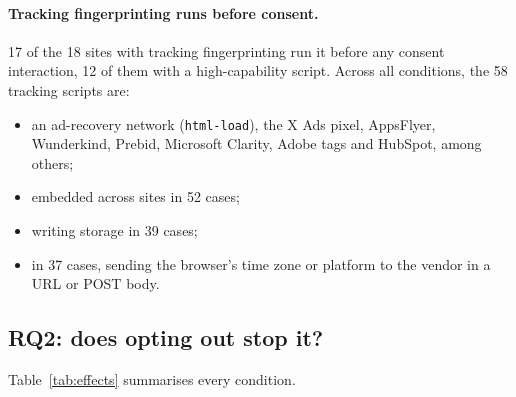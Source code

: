\documentclass[sigconf,review,anonymous]{acmart}
\begin{document}
\paragraph{Tracking fingerprinting runs before consent.} 17 of the 18 sites with tracking
fingerprinting run it before any consent interaction, 12 of them with a high-capability script.
Across all conditions, the 58 tracking scripts are:
\begin{itemize}
\item an ad-recovery network (\texttt{html-load}), the X Ads pixel, AppsFlyer, Wunderkind,
  Prebid, Microsoft Clarity, Adobe tags and HubSpot, among others;
\item embedded across sites in 52 cases;
\item writing storage in 39 cases;
\item in 37 cases, sending the browser's time zone or platform to the vendor in a URL or POST
  body.
\end{itemize}

\subsection{RQ2: does opting out stop it?}
Table~\ref{tab:effects} summarises every condition.
\end{document}

